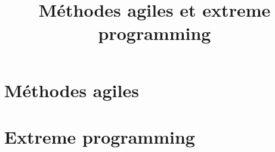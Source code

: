\documentclass{beamer}
\title{Méthodes agiles et extreme programming}
\begin{document}
    \begin{frame}

    \maketitle

    \end{frame}
    
    \section{Méthodes agiles}
    
	
	\section{Extreme programming}
    
\end{document}
